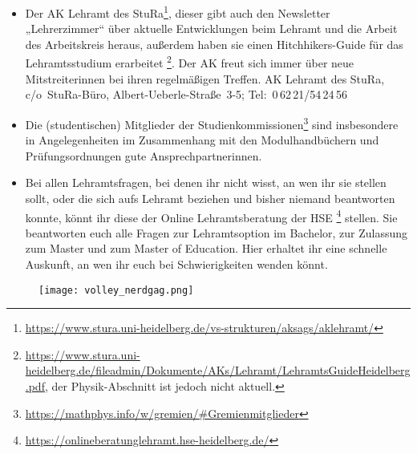 \begin{itemize}
\item Der AK Lehramt des StuRa\footnote{\url{https://www.stura.uni-heidelberg.de/vs-strukturen/aksags/aklehramt/}}, dieser gibt auch den Newsletter „Lehrerzimmer“ über aktuelle Entwicklungen beim Lehramt und die Arbeit des Arbeitskreis heraus, außerdem haben sie einen Hitchhikers-Guide für das Lehramtsstudium erarbeitet \footnote{\url{https://www.stura.uni-heidelberg.de/fileadmin/Dokumente/AKs/Lehramt/LehramtsGuideHeidelberg.pdf}, der Physik-Abschnitt ist jedoch nicht aktuell.}. Der AK freut sich immer über neue Mitstreiterinnen bei ihren regelmäßigen Treffen.  \newline AK Lehramt des StuRa, c/o~StuRa-Büro, Albert-Ueberle-Straße~3-5; Tel:~0\,62\,21/54\,24\,56

\item Die (studentischen) Mitglieder der Studienkommissionen\footnote{\url{https://mathphys.info/w/gremien/\#Gremienmitglieder}} sind insbesondere in Angelegenheiten im Zusammenhang mit den Modulhandbüchern und Prüfungsordnungen gute Ansprechpartnerinnen.

\item Bei allen Lehramtsfragen, bei denen ihr nicht wisst, an wen ihr sie stellen sollt, oder die sich aufs Lehramt beziehen und bisher niemand beantworten konnte, könnt ihr diese der Online Lehramtsberatung der HSE \footnote{\url{https://onlineberatunglehramt.hse-heidelberg.de/}} stellen. Sie beantworten euch alle Fragen zur Lehramtsoption im Bachelor, zur Zulassung zum Master und zum Master of Education. Hier erhaltet ihr eine schnelle Auskunft, an wen ihr euch bei Schwierigkeiten wenden könnt.


\end{itemize}



\begin{figure}[h]
\texttt{[image: volley\_nerdgag.png]}

\end{figure}

